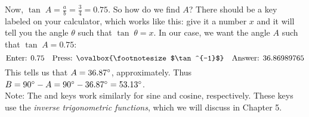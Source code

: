 \begin{exmp}
\begin{enumerate}[\bfseries (a)]
\begin{displaymath}
   \end{displaymath}
   Now, $\tan\;A = \frac{a}{b} = \frac{3}{4} = 0.75$. So how do we find $A$?
   There should be a key labeled {\setlength\fboxsep{1pt}}
   on your calculator, which works like
   this: give it a number $x$ and it will tell you the angle $\theta$ such that $\tan\;\theta = x$.
   In our case, we want the angle $A$ such that $\tan\;A = 0.75$:
   \begin{displaymath}
    \text{Enter: } 0.75 \quad \text{Press:
	{\setlength\fboxsep{1pt}\ovalbox{\footnotesize $\tan^{-1}$}}} \quad \text{Answer: } 36.86989765
   \end{displaymath}
   This tells us that $A = 36.87^\circ$, approximately. Thus $B = 90^\circ - A = 
   90^\circ - 36.87^\circ = 53.13^\circ$.\\Note: The
   {\setlength\fboxsep{1pt}} and
   {\setlength\fboxsep{1pt}}
   keys work similarly for sine and cosine, respectively. These keys
   use the \emph{inverse trigonometric functions}, which we
   will discuss in Chapter 5.
 \end{enumerate}
\end{exmp}\vspace{-2mm}
\divider

